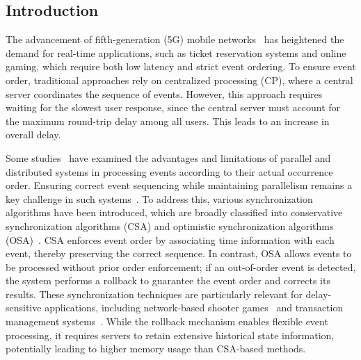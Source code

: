\documentclass[10pt, letterpaper]{IEEEtran}
\begin{document}
\begin{CJK}{UTF8}{ipxm}
\section{Introduction}
\label{sec:introduction}

The advancement of fifth-generation (5G) mobile networks~\cite{DOCOMO_5G} has heightened the demand for real-time applications, such as ticket reservation systems and online gaming, which require both low latency and strict event ordering.
To ensure event order, traditional approaches rely on centralized processing (CP), where a central server coordinates the sequence of events.
However, this approach requires waiting for the slowest user response, since the central server must account for the maximum round-trip delay among all users. 
This leads to an increase in overall delay.

Some studies~\cite{OSA_Kawabata_5,OSA_Kawabata_6} have examined the advantages and limitations of parallel and distributed systems in processing events according to their actual occurrence order. 
Ensuring correct event sequencing while maintaining parallelism remains a key challenge in such systems~\cite{OSA_Kawabata_7,OSA_Kawabata_8}. 
To address this, various synchronization algorithms have been introduced, which are broadly classified into conservative synchronization algorithms (CSA) and optimistic synchronization algorithms (OSA)~\cite{OSA_Kawabata_9}. 
CSA enforces event order by associating time information with each event, thereby preserving the correct sequence. 
In contrast, OSA allows events to be processed without prior order enforcement; if an out-of-order event is detected, the system performs a rollback to guarantee the event order and corrects its results.
These synchronization techniques are particularly relevant for delay-sensitive applications, including network-based shooter games~\cite{OSA_Kawabata_10} and transaction management systems~\cite{OSA_Kawabata_11}.
While the rollback mechanism enables flexible event processing, it requires servers to retain extensive historical state information, potentially leading to higher memory usage than CSA-based methods.


\end{CJK}
\end{document}
